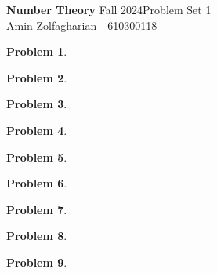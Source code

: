 \documentclass[12pt]{article}
\newcommand{\customanswer}[1]{%
\begin{problem}
\end{problem}

}
\newtheorem{problem}{Problem}
\begin{document}
\noindent \textbf{Number Theory} Fall 2024\hfill Problem Set 1\\
Amin Zolfagharian - 610300118

\hrulefill

\customanswer{1}
\customanswer{2}
\newpage
\customanswer{3}
\customanswer{4}
\newpage
\customanswer{5}
\customanswer{6}
\customanswer{7}
\newpage
\customanswer{8}
\customanswer{9}
\end{document}

